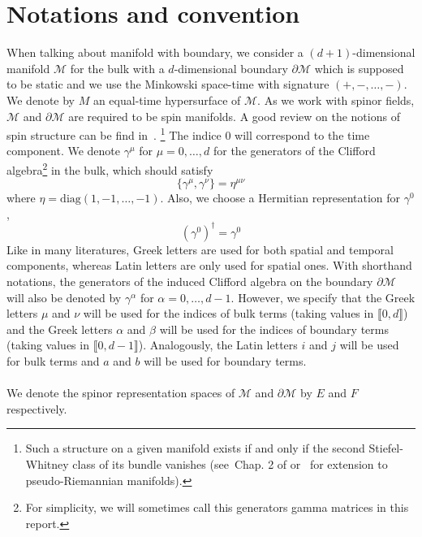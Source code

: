 \section*{Notations and convention}
When talking about manifold with boundary, we consider a $(d+1)$-dimensional manifold $\mathcal{M}$ for the bulk with a $d$-dimensional boundary $\partial \mathcal{M}$ which is supposed to be static and we use the Minkowski space-time with signature $(+, -,\ldots, -)$.
We denote by $M$ an equal-time hypersurface of $\mathcal{M}$.
As we work with spinor fields, $\mathcal{M}$ and $\partial \mathcal{M}$ are required to be spin manifolds. 
A good review on the notions of spin structure can be find in~\cite{Trautman2007}.
\footnote{
Such a structure on a given manifold exists if and only if the second Stiefel-Whitney class of its bundle vanishes (see~\eg Chap. 2 of \cite{Lawson1989} or~\cite{Alagia1985} for extension to pseudo-Riemannian manifolds).}
%
The indice 0 will correspond to the time component.
We denote $\gamma^\mu$ for $\mu = 0, \ldots, d$ for the generators of the Clifford algebra\footnote{
For simplicity, we will sometimes call this generators gamma matrices in this report.
} in the bulk, which should satisfy
\begin{equation*}
\{ \gamma^\mu, \gamma^\nu \} = \eta^{\mu\nu}
\end{equation*} 
where $\eta = \mathrm{diag}(1, -1 ,\ldots, -1)$.
Also, we choose a Hermitian representation for $\gamma^0$, 
\ie
\begin{equation*}
(\gamma^0)^\dagger = \gamma^0
\end{equation*}
Like in many literatures, Greek letters are used for both spatial and temporal components, whereas Latin letters are only used for spatial ones.
With shorthand notations, the generators of the induced Clifford algebra on the boundary $\partial \mathcal{M}$ will also be denoted by $\gamma^\alpha$ for $\alpha = 0 ,\ldots, d-1$. 
However, we specify that the Greek letters $\mu$ and $\nu$ will be used for the indices of bulk terms (taking values in $\llbracket 0, d \rrbracket$) and the Greek letters $\alpha$ and $\beta$ will be used for the indices of boundary terms (taking values in $\llbracket 0, d-1 \rrbracket$).
Analogously, the Latin letters $i $ and $j$ will be used for bulk terms and $a$ and $b$ will be used for boundary terms. \\\\
%
We denote the spinor representation spaces of $\mathcal{M}$ and $\partial \mathcal{M}$ by $E$ and $F$ respectively.

